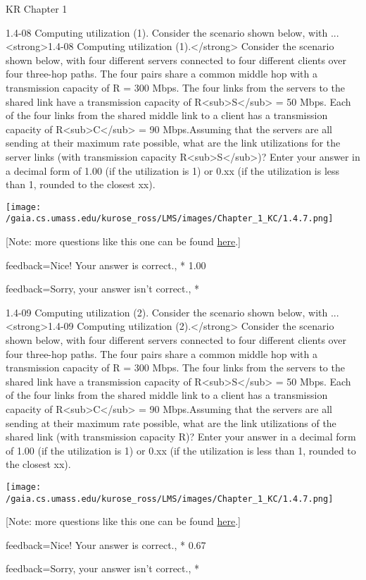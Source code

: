 \documentclass[a4paper]{article}
\begin{document}
\begin{quiz}{KR Chapter 1}
\begin{shortanswer}[
	points=1,
	penalty=0.33333,
]{1.4-08 Computing utilization (1). Consider the scenario shown below, with ...}
<strong>1.4-08 Computing utilization (1).</strong> Consider the scenario shown below, with four different servers connected to four different clients over four three-hop paths. The four pairs share a common middle hop with a transmission capacity of R = 300 Mbps. The four links from the servers to the shared link have a transmission capacity of R<sub>S</sub> = 50 Mbps. Each of the four links from the shared middle link to a client has a transmission capacity of R<sub>C</sub> = 90 Mbps.Assuming that the servers are all sending at their maximum rate possible, what are the link utilizations for the server links (with transmission capacity R<sub>S</sub>)? Enter your answer in a decimal form of 1.00 (if the utilization is 1) or 0.xx (if the utilization is less than 1, rounded to the closest xx). 
\begin{center}
\texttt{[image: /gaia.cs.umass.edu/kurose\_ross/LMS/images/Chapter\_1\_KC/1.4.7.png]}
\end{center}
 [Note: more questions like this one can be found \href{http://gaia.cs.umass.edu/kurose_ross/interactive/end-end-throughput-simple.php}{here}.]
\item[feedback={Nice!  Your answer is correct.},]* 1.00
\item[feedback={Sorry, your answer isn't correct.},] *
\end{shortanswer}

\begin{shortanswer}[
	points=1,
	penalty=0.33333,
]{1.4-09 Computing utilization (2). Consider the scenario shown below, with ...}
<strong>1.4-09 Computing utilization (2).</strong> Consider the scenario shown below, with four different servers connected to four different clients over four three-hop paths. The four pairs share a common middle hop with a transmission capacity of R = 300 Mbps. The four links from the servers to the shared link have a transmission capacity of R<sub>S</sub> = 50 Mbps. Each of the four links from the shared middle link to a client has a transmission capacity of R<sub>C</sub> = 90 Mbps.Assuming that the servers are all sending at their maximum rate possible, what are the link utilizations of the shared link (with transmission capacity R)? Enter your answer in a decimal form of 1.00 (if the utilization is 1) or 0.xx (if the utilization is less than 1, rounded to the closest xx). 
\begin{center}
\texttt{[image: /gaia.cs.umass.edu/kurose\_ross/LMS/images/Chapter\_1\_KC/1.4.7.png]}
\end{center}
 [Note: more questions like this one can be found \href{http://gaia.cs.umass.edu/kurose_ross/interactive/end-end-throughput-simple.php}{here}.]
\item[feedback={Nice!  Your answer is correct.},]* 0.67
\item[feedback={Sorry, your answer isn't correct.},] *
\end{shortanswer}


\end{quiz}
\end{document}
